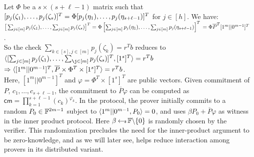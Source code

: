 Let $\Phi$ be a $s\times (s+\ell-1)$ matrix such that $[p_j(\zeta_1), \ldots,
p_j(\zeta_s)]^T \\= \Phi  [p_j(\eta_1), \ldots, p_j(\eta_{s+\ell-1})]^T$ for
$j\in[h]$. We have: %
\\
$\big[ \sum_{j\in[m]} p_j(\zeta_1), \ldots,  \sum_{j\in[m]}
p_j(\zeta_s)\big]^T 
   \\ =\Phi  \left[\sum_{j\in[m]} p_j(\eta_1), \ldots, \sum_{j\in[m]}
p_j(\eta_{s+\ell-1})\right]^T
	\\= \Phi  \overline{P}^T  [1^m||0^{m-1}]^T
$.
\\So the check $\sum_{k\in[s], j\in[m]}p_j(\zeta_k)=r^Tb$ reduces to \\$\innp{[\sum_{j\in[m]} p_j(\zeta_1), \ldots, \sum_{\j\in[m]} p_j(\zeta_s)]^T}{[1^s]^T} =r^Tb$ 
\\$\Rightarrow \langle [1^m||0^{m-1}]^T,\overline{P}\times \Phi^T \times [1^s]^T\rangle = r^Tb$.
\\Here, $[1^m||0^{m-1}]^T$ and $\varphi = \Phi^T \times [1^s]^T$ are public vectors. 
Given commitment of $P$,  $c_1,\ldots,c_{s+\ell-1}$, the
commitment to $\overline{P}\varphi$ can be computed as
$\mathsf{cm}=\prod_{k=1}^{s+\ell-1}(c_k)^{\varphi_k}$.
In the protocol, 
the prover initially commits to a random $P_0\in \mathbb{F}^{2m-1}$ subject to $\langle 1^{m}|| 0^{m-1},P_0\rangle=0$, and 
uses $\beta P_0 + \overline{P} \varphi$ as witness in the inner product protocol. Here 
$\beta\hskip2.3pt{\gets\!\!\mbox{\tiny${\$}$\normalsize}}\, \mathbb{F}\backslash \{0\}$ is randomly chosen by the verifier. This randomization
precludes the need for the inner-product argument to be zero-knowledge, and as we will later
see, helps reduce interaction among provers in its distributed variant.
\smallskip  


\begin{comment} 
 Observe that, $p(\etabar)^T = \overline{P}^T \times [1^m || 0^m]^T$\\
 $\Rightarrow p(\zetabar)^T =\Phi \times \overline{P}^T \times [1^m || 0^m]^T$\\
 $\Rightarrow p(\zetabar)^T =[1^m || 0^m] \times \overline{P}\times \Phi^T$\\
 Therefore, the check $\sum_{k\in[s]}\sum_{j\in[m]}p_j(\zeta_k)=r^Tb$ reduces to $\innp{p(\zetabar)}{[1^s]} =r^Tb$ that can be viewed as $\innp{[1^m || 0^m] \times \overline{P}\times \Phi^T}{[1^s]} = \innp{[1^m||0^m]^T}{\overline{P}\times \Phi^T \times [1^s]^T} = r^Tb$. 
 \end{comment} 
 

